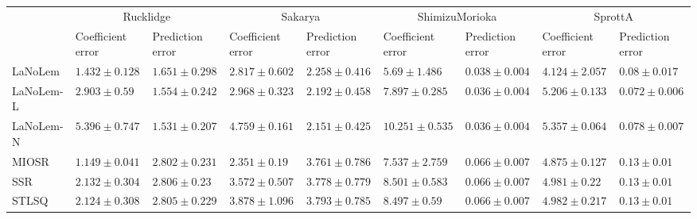 \begin{table*}
{\begin{tabular}{lllllllll}
 & \multicolumn{2}{c}{Rucklidge} & \multicolumn{2}{c}{Sakarya} & \multicolumn{2}{c}{ShimizuMorioka} & \multicolumn{2}{c}{SprottA} \\
 & Coefficient error & Prediction error & Coefficient error & Prediction error & Coefficient error & Prediction error & Coefficient error & Prediction error \\
\midrule
LaNoLem & $1.432\pm 0.128$ & $1.651\pm 0.298$ & $2.817\pm 0.602$ & $2.258\pm 0.416$ & $\mathbf{5.69}\pm 1.486$ & $0.038\pm 0.004$ & $\mathbf{4.124}\pm 2.057$ & $0.08\pm 0.017$ \\
LaNoLem-L & $2.903\pm 0.59$ & $1.554\pm 0.242$ & $2.968\pm 0.323$ & $2.192\pm 0.458$ & $7.897\pm 0.285$ & $0.036\pm 0.004$ & $5.206\pm 0.133$ & $\mathbf{0.072}\pm 0.006$ \\
LaNoLem-N & $5.396\pm 0.747$ & $\mathbf{1.531}\pm 0.207$ & $4.759\pm 0.161$ & $\mathbf{2.151}\pm 0.425$ & $10.251\pm 0.535$ & $\mathbf{0.036}\pm 0.004$ & $5.357\pm 0.064$ & $0.078\pm 0.007$ \\
MIOSR & $\mathbf{1.149}\pm 0.041$ & $2.802\pm 0.231$ & $\mathbf{2.351}\pm 0.19$ & $3.761\pm 0.786$ & $7.537\pm 2.759$ & $0.066\pm 0.007$ & $4.875\pm 0.127$ & $0.13\pm 0.01$ \\
SSR & $2.132\pm 0.304$ & $2.806\pm 0.23$ & $3.572\pm 0.507$ & $3.778\pm 0.779$ & $8.501\pm 0.583$ & $0.066\pm 0.007$ & $4.981\pm 0.22$ & $0.13\pm 0.01$ \\
STLSQ & $2.124\pm 0.308$ & $2.805\pm 0.229$ & $3.878\pm 1.096$ & $3.793\pm 0.785$ & $8.497\pm 0.59$ & $0.066\pm 0.007$ & $4.982\pm 0.217$ & $0.13\pm 0.01$ \\

\midrule


\end{tabular}}
\end{table*}
